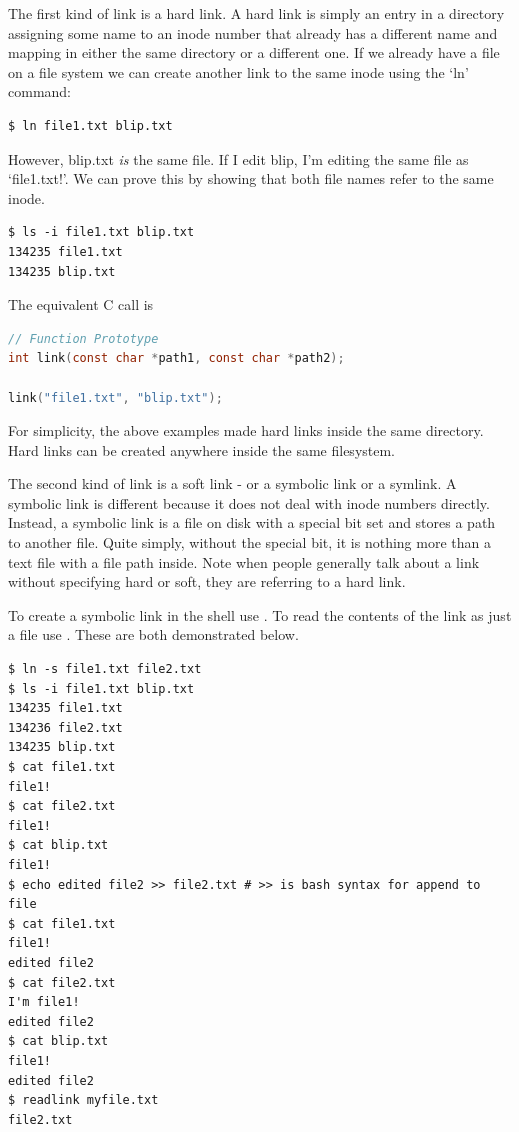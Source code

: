 The first kind of link is a hard link.
A hard link is simply an entry in a directory assigning some name to an inode number that already has a different name and mapping in either the same directory or a different one.
If we already have a file on a file system we can create another link to the same inode using the `ln' command:

\begin{verbatim}
$ ln file1.txt blip.txt
\end{verbatim}

However, blip.txt \emph{is} the same file.
If I edit blip, I'm editing the same file as `file1.txt!'.
We can prove this by showing that both file names refer to the same inode.

\begin{verbatim}
$ ls -i file1.txt blip.txt
134235 file1.txt
134235 blip.txt
\end{verbatim}

The equivalent C call is 

\begin{lstlisting}[language=C]
// Function Prototype
int link(const char *path1, const char *path2);

link("file1.txt", "blip.txt");
\end{lstlisting}

For simplicity, the above examples made hard links inside the same directory.
Hard links can be created anywhere inside the same filesystem.

The second kind of link is a soft link - or a symbolic link or a symlink.
A symbolic link is different because it does not deal with inode numbers directly.
Instead, a symbolic link is a file on disk with a special bit set and stores a path to another file.
Quite simply, without the special bit, it is nothing more than a text file with a file path inside.
Note when people generally talk about a link without specifying hard or soft, they are referring to a hard link.

To create a symbolic link in the shell use .
To read the contents of the link as just a file use .
These are both demonstrated below.

\begin{verbatim}
$ ln -s file1.txt file2.txt
$ ls -i file1.txt blip.txt
134235 file1.txt
134236 file2.txt
134235 blip.txt
$ cat file1.txt
file1!
$ cat file2.txt
file1!
$ cat blip.txt
file1!
$ echo edited file2 >> file2.txt # >> is bash syntax for append to file
$ cat file1.txt
file1!
edited file2
$ cat file2.txt
I'm file1!
edited file2
$ cat blip.txt
file1!
edited file2
$ readlink myfile.txt
file2.txt
\end{verbatim}

